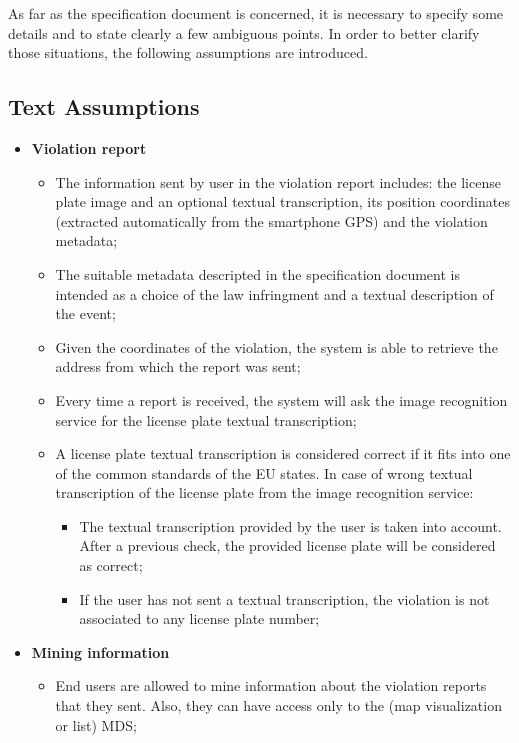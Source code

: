 As far as the specification document is concerned, it is necessary to specify some details and to state clearly a few ambiguous points. In order to better clarify those situations, the following assumptions are introduced.
\subsection{Text Assumptions}
\begin{itemize}
    \item \textbf{Violation report}
        \begin{itemize}
            \item The information sent by user in the violation report includes: the license plate image and an optional textual transcription, its position coordinates (extracted automatically from the smartphone GPS) and the violation metadata;
            \item The suitable metadata descripted in the specification document is intended as a choice of the law infringment and a textual description of the event;
            \item Given the coordinates of the violation, the system is able to retrieve the address from which the report was sent;
            \item Every time a report is received, the system will ask the image recognition service for the license plate textual transcription;
            \item A license plate textual transcription is considered correct if it fits into one of the common standards of the EU states. In case of wrong textual transcription of the license plate from the image recognition service:
            \begin{itemize}
                \item The textual transcription provided by the user is taken into account. After a previous check, the provided license plate will be considered as correct;
                \item If the user has not sent a textual transcription, the violation is not associated to any license plate number;
            \end{itemize} 
        \end{itemize}
    \item \textbf{Mining information} 
        \begin{itemize}
            \item End users are allowed to mine information about the violation reports that they sent. Also, they can have access only to the (map visualization or list) MDS;

\end{itemize}
\end{itemize}

